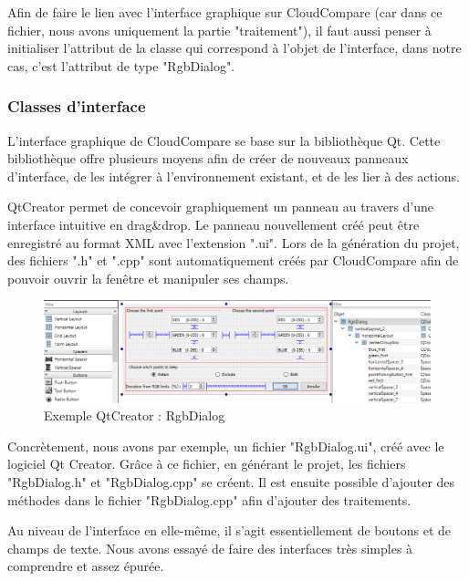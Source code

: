 \documentclass[12pt,titlepage,french]{article}
\begin{document}
Afin de faire le lien avec l'interface graphique sur CloudCompare (car dans ce fichier, nous avons uniquement la partie "traitement"), il faut aussi penser à initialiser l'attribut de la classe qui correspond à l'objet de l'interface, dans notre cas, c'est l'attribut de type "RgbDialog".

\subsubsection{Classes d'interface}

L'interface graphique de CloudCompare se base sur la bibliothèque Qt. Cette bibliothèque offre plusieurs moyens afin de créer de nouveaux panneaux d'interface, de les intégrer à l'environnement existant, et de les lier à des actions. \newline

QtCreator permet de concevoir graphiquement un panneau au travers d'une interface intuitive en drag\&drop. Le panneau nouvellement créé peut être enregistré au format XML avec l'extension ".ui". Lors de la génération du projet, des fichiers ".h" et ".cpp" sont automatiquement créés par CloudCompare afin de pouvoir ouvrir la fenêtre et manipuler ses champs. \newline

\begin{figure}[H]
\center
  \includegraphics[width=1\textwidth]{./img/qt_creator.PNG}
  \caption{\label{} Exemple QtCreator : RgbDialog}
\end{figure}

Concrètement, nous avons par exemple, un fichier "RgbDialog.ui", créé avec le logiciel Qt Creator. Grâce à ce fichier, en générant le projet, les fichiers "RgbDialog.h" et "RgbDialog.cpp" se créent. Il est ensuite possible d'ajouter des méthodes dans le fichier "RgbDialog.cpp" afin d'ajouter des traitements. \newline

Au niveau de l'interface en elle-même, il s'agit essentiellement de boutons et de champs de texte. Nous avons essayé de faire des interfaces très simples à comprendre et assez épurée.  \newline
\end{document}
